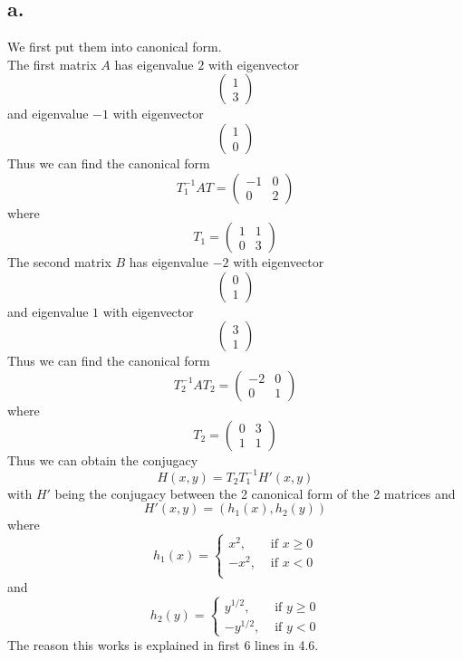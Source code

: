 \documentclass[11pt]{article}
\theoremstyle{mystyle}
\theoremstyle{definition}
\begin{document}
\subsection*{a.}
We first put them into canonical form. \\
The first matrix $A$ has eigenvalue $2$ with eigenvector 
\[
  \begin{pmatrix}
    1 \\
    3
  \end{pmatrix}
\]
and eigenvalue $-1$ with eigenvector 
\[
  \begin{pmatrix}
    1 \\ 
    0
  \end{pmatrix}
\]
Thus we can find the canonical form 
\[
 T_1^{-1}AT = 
 \begin{pmatrix}
  -1 & 0 \\
  0 & 2
\end{pmatrix}  
\]
where
\[
  T_1 = 
  \begin{pmatrix}
    1 & 1 \\
    0 & 3
  \end{pmatrix}
\]
The second matrix $B$ has eigenvalue $-2$ with eigenvector 
\[
  \begin{pmatrix}
    0 \\
    1
  \end{pmatrix}
\]
and eigenvalue $1$ with eigenvector 
\[
  \begin{pmatrix}
    3 \\ 
    1
  \end{pmatrix}
\]
Thus we can find the canonical form 
\[
 T_2^{-1} A T_2 = \begin{pmatrix}
  -2 & 0 \\
  0 & 1
\end{pmatrix}  
\]
where 
\[
  T_2 = 
  \begin{pmatrix}
    0 & 3 \\
    1 & 1
  \end{pmatrix}
\]
Thus we can obtain the conjugacy
\[
  H(x,y) = T_2 T_1^{-1} H'(x,y)
\]
with $H'$ being the conjugacy between the 2 canonical form of the 2 matrices and 
\[
  H'(x,y) = (h_1(x), h_2(y))
\]
where 
\[
  h_1(x) = 
  \begin{cases}
    x^2, &\text{ if } x \ge 0\\
    -x^2, &\text{ if } x < 0\\
  \end{cases}
\]
and 
\[
  h_2(y) = 
  \begin{cases}
    y^{1/2}, &\text{ if } y \ge 0 \\
    -y^{1/2}, &\text{ if } y < 0
  \end{cases}
\]
The reason this works is explained in first 6 lines in 4.6.
\end{document}
